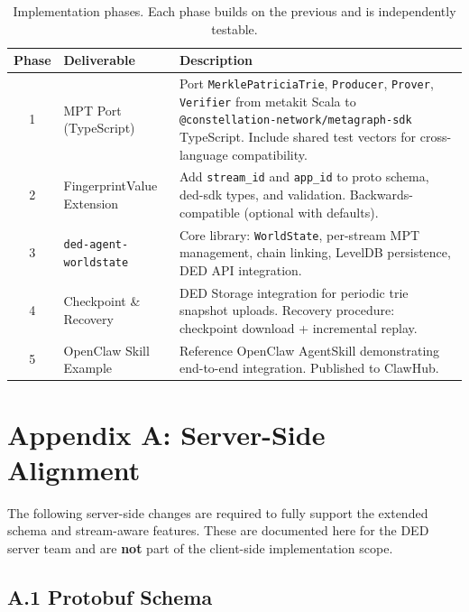 \documentclass[11pt,a4paper]{article}
\begin{document}
\begin{table}[H]
\centering
\begin{tabular}{@{}clp{7cm}@{}}
\toprule
\textbf{Phase} & \textbf{Deliverable} & \textbf{Description} \\
\midrule
1 & MPT Port (TypeScript) & Port \texttt{MerklePatriciaTrie}, \texttt{Producer},
  \texttt{Prover}, \texttt{Verifier} from metakit Scala to
  \texttt{@constellation-network/metagraph-sdk} TypeScript. Include shared test vectors for
  cross-language compatibility. \\[6pt]
2 & FingerprintValue Extension & Add \texttt{stream\_id} and \texttt{app\_id} to proto
  schema, ded-sdk types, and validation. Backwards-compatible (optional with defaults). \\[6pt]
3 & \texttt{ded-agent-worldstate} & Core library: \texttt{WorldState}, per-stream MPT
  management, chain linking, LevelDB persistence, DED API integration. \\[6pt]
4 & Checkpoint \& Recovery & DED Storage integration for periodic trie snapshot uploads.
  Recovery procedure: checkpoint download + incremental replay. \\[6pt]
5 & OpenClaw Skill Example & Reference OpenClaw AgentSkill demonstrating end-to-end
  integration. Published to ClawHub. \\
\bottomrule
\end{tabular}
\caption{Implementation phases. Each phase builds on the previous and is independently
testable.}
\label{tab:roadmap}
\end{table}


\section*{Appendix A: Server-Side Alignment}

The following server-side changes are required to fully support the extended schema and
stream-aware features. These are documented here for the DED server team and are
\textbf{not} part of the client-side implementation scope.

\subsection*{A.1 Protobuf Schema}
\end{document}
